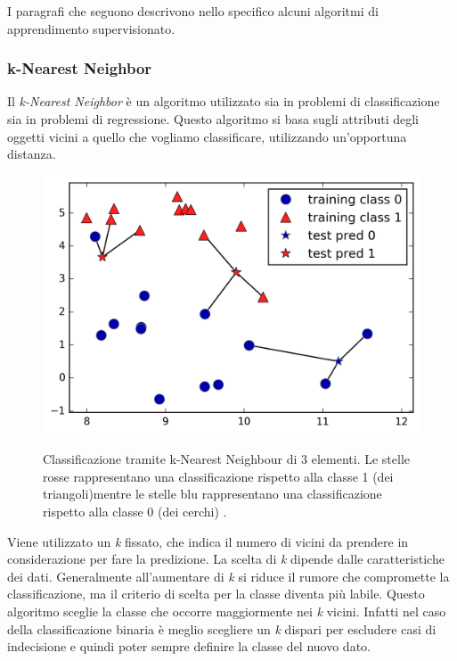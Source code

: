 \documentclass[a4paper,12pt]{report}
\begin{document}
\bigskip
I paragrafi che seguono descrivono nello specifico alcuni algoritmi di apprendimento supervisionato.

\subsubsection{k-Nearest Neighbor}

Il \textit{k-Nearest Neighbor} è un algoritmo utilizzato sia in problemi di classificazione sia in problemi di regressione. 
Questo algoritmo si basa sugli attributi degli oggetti vicini a quello che vogliamo classificare, utilizzando un'opportuna distanza.


\begin{figure}[ht]
    \centering
    \includegraphics[scale = 0.2]{images/knearest_3_vicini.png}
    \label{fig:knearest_3_vicini}
    \caption{Classificazione tramite k-Nearest Neighbour di 3 elementi. Le stelle rosse rappresentano una classificazione rispetto alla classe 1 (dei triangoli)mentre le stelle blu rappresentano una classificazione rispetto alla classe 0 (dei cerchi) \cite{figure_copyright}.}
\end{figure}


Viene utilizzato un \textit{k} fissato, che indica il numero di vicini da prendere in considerazione per fare la predizione.
La scelta di \textit{k} dipende dalle caratteristiche dei dati. Generalmente all'aumentare di \textit{k} si riduce il rumore che compromette la classificazione, ma il criterio di scelta per la classe diventa più labile.
Questo algoritmo sceglie la classe che occorre maggiormente nei \textit{k} vicini. Infatti nel caso della classificazione binaria è meglio scegliere un \textit{k} dispari per escludere casi di indecisione e quindi poter sempre definire la classe del nuovo dato.
\end{document}
